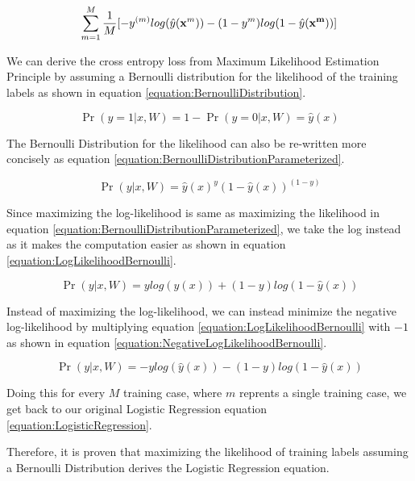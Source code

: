 \documentclass[a4paper,12pt]{article}
\begin{document}
\begin{equation}
\label{equation:LogisticRegression}
\sum_{m=1}^{M}\frac{1}{M}[-y^{(m)}log(\hat{y}(\mathbf{x}^{m})) - (1-y^{m})log(1-\hat{y}(\bf{x}^{m}))]
\end{equation}

We can derive the cross entropy loss from Maximum Likelihood Estimation Principle by assuming a Bernoulli distribution for the likelihood of the training labels as shown in equation \ref{equation:BernoulliDistribution}. 

\begin{equation}
\label{equation:BernoulliDistribution}
\Pr(y=1|x, W) = 1 - \Pr(y=0|x, W) = \hat{y}(x)
\end{equation}

The Bernoulli Distribution for the likelihood can also be re-written more concisely as equation \ref{equation:BernoulliDistributionParameterized}. 

\begin{equation}
\label{equation:BernoulliDistributionParameterized}
\Pr(y|x, W) = \hat{y}(x)^{y}(1-\hat{y}(x))^{(1-y)}
\end{equation}

Since maximizing the log-likelihood is same as maximizing the likelihood in equation \ref{equation:BernoulliDistributionParameterized}, we take the log instead as it makes the computation easier as shown in equation \ref{equation:LogLikelihoodBernoulli}. 

\begin{equation}
\label{equation:LogLikelihoodBernoulli}
\Pr(y|x, W) = ylog(\hat{y}(x)) + (1-y)log(1-\hat{y}(x))
\end{equation}

Instead of maximizing the log-likelihood, we can instead minimize the negative log-likelihood by multiplying equation \ref{equation:LogLikelihoodBernoulli} with $-1$ as shown in equation
\ref{equation:NegativeLogLikelihoodBernoulli}. 

\begin{equation}
\label{equation:NegativeLogLikelihoodBernoulli}
\Pr(y|x, W) = -ylog(\hat{y}(x)) - (1-y)log(1-\hat{y}(x))
\end{equation}

Doing this for every $M$ training case, where $m$ reprents a single training case, we get back to our original Logistic Regression equation \ref{equation:LogisticRegression}. 

Therefore, it is proven that maximizing the likelihood of training labels assuming a Bernoulli Distribution derives the Logistic Regression equation. 
\end{document}
